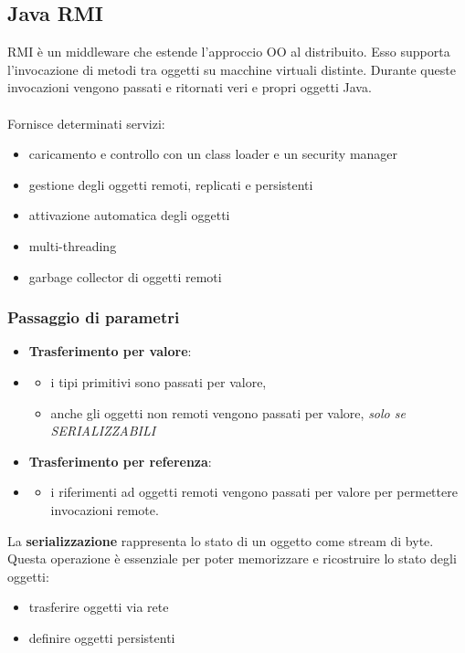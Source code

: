\documentclass[12pt, a4paper]{article}
\begin{document}
    \subsection{Java RMI}
    RMI è un middleware che estende l'approccio OO al distribuito. Esso supporta
    l'invocazione di metodi tra oggetti su macchine virtuali distinte.
    Durante queste invocazioni vengono passati e ritornati veri e propri oggetti Java.
    \\\\Fornisce determinati servizi:
    \begin{itemize}
        \item caricamento e controllo con un class loader e un security manager
        \item gestione degli oggetti remoti, replicati e persistenti
        \item attivazione automatica degli oggetti
        \item multi-threading
        \item garbage collector di oggetti remoti
    \end{itemize}

    \subsubsection{Passaggio di parametri}
    \begin{itemize}
        \item \textbf{Trasferimento per valore}:
        \item \begin{itemize}
            \item i tipi primitivi sono passati per valore,
            \item anche gli oggetti non remoti vengono passati per valore, \textit{solo se SERIALIZZABILI}
        \end{itemize}
        \item \textbf{Trasferimento per referenza}:
        \item \begin{itemize}
            \item i riferimenti ad oggetti remoti vengono passati per valore per permettere invocazioni remote. 
        \end{itemize}
    \end{itemize}
    La \textbf{serializzazione} rappresenta lo stato di un oggetto come stream di byte.
    Questa operazione è essenziale per poter memorizzare e ricostruire lo stato degli oggetti:
    \begin{itemize}
        \item trasferire oggetti via rete
        \item definire oggetti persistenti
    \end{itemize}
    
\end{document}
